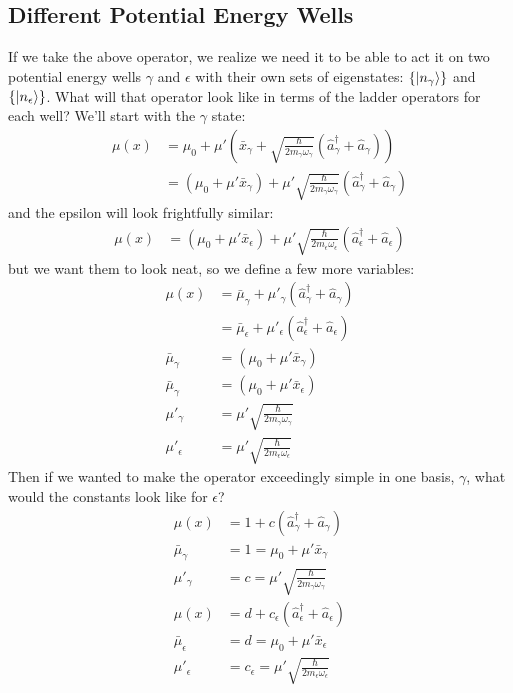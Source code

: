 \subsection{Different Potential Energy Wells}
If we take the above operator, we realize we need it to be able to act it on two potential energy wells $\gamma$ and $\epsilon$ with their own sets of eigenstates: $\{ \ket{n_{\gamma}}\}$ and $\{ \ket{n_{\epsilon}}\}$.  What will that operator look like in terms of the ladder operators for each well?  We'll start with the $\gamma$ state:
\begin{align}
	\mu(x) &= \mu_0  + \mu' \left(  \bar{x}_{\gamma}+ \sqrt{\frac{\hbar}{2 m_{\gamma} \omega_{\gamma}}} \left(  \hat{a}_{\gamma}^{\dagger} + \hat{a}_{\gamma}  \right)\right) \\
	&= \left( \mu_0  + \mu'   \bar{x}_{\gamma} \right)  + \mu'  \sqrt{\frac{\hbar}{2 m_{\gamma} \omega_{\gamma}}} \left(  \hat{a}_{\gamma}^{\dagger} + \hat{a}_{\gamma}  \right)
\end{align}
and the epsilon will look frightfully similar:
\begin{align}
	\mu(x) 	&= \left( \mu_0  + \mu'   \bar{x}_{\epsilon} \right)  + \mu'  \sqrt{\frac{\hbar}{2 m_{\epsilon} \omega_{\epsilon}}} \left(  \hat{a}_{\epsilon}^{\dagger} + \hat{a}_{\epsilon}  \right)
\end{align}
but we want them to look neat, so we define a few more variables:
\begin{align}
	\mu(x) &= \bar{\mu}_{\gamma} + \mu'_{\gamma }  \left(  \hat{a}_{\gamma}^{\dagger} + \hat{a}_{\gamma}  \right) \\
	&= \bar{\mu}_{\epsilon} + \mu'_{\epsilon }  \left(  \hat{a}_{\epsilon}^{\dagger} + \hat{a}_{\epsilon}  \right) \\
	\bar{\mu}_{\gamma}  &= \left( \mu_0  + \mu'   \bar{x}_{\gamma} \right) \\
	\bar{\mu}_{\gamma}  &= \left( \mu_0  + \mu'   \bar{x}_{\epsilon} \right) \\
	\mu'_{\gamma } &=  \mu'  \sqrt{\frac{\hbar}{2 m_{\gamma} \omega_{\gamma}}} \\
	\mu'_{\epsilon } &=  \mu'  \sqrt{\frac{\hbar}{2 m_{\epsilon} \omega_{\epsilon}}}
\end{align}
Then if we wanted to make the operator exceedingly simple in one basis, $\gamma$, what would the constants look like for $\epsilon$?
\begin{align*}
	\mu(x) &= 1+ c \left(  \hat{a}_{\gamma}^{\dagger} + \hat{a}_{\gamma}  \right) \\
	\bar{\mu}_{\gamma} &= 1 =  \mu_0  + \mu'   \bar{x}_{\gamma}  \\
	\mu'_{\gamma }  &= c = \mu'  \sqrt{\frac{\hbar}{2 m_{\gamma} \omega_{\gamma}}}\\
	\mu(x) &= d+ c_{\epsilon} \left(  \hat{a}_{\epsilon}^{\dagger} + \hat{a}_{\epsilon}  \right) \\
	\bar{\mu}_{\epsilon} &= d =  \mu_0  + \mu'   \bar{x}_{\epsilon}  \\
	\mu'_{\epsilon }  &= c_{\epsilon} = \mu'  \sqrt{\frac{\hbar}{2 m_{\epsilon} \omega_{\epsilon}}}\\
\end{align*}
